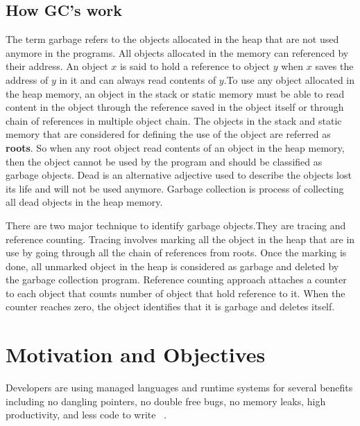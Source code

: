 \subsection{How GC's work}
The term garbage refers to the objects allocated in the heap that are not used anymore in the programs. All objects allocated in the memory can referenced by their address. An object $x$ is said to hold a reference to object $y$ when $x$ saves the address of $y$ in it and can always read contents of $y$.To use any object allocated in the heap memory, an object in the stack or static memory must be able to read content in the object through the reference saved in the object itself or through chain of references in multiple object chain.
The objects in the stack and static memory that are considered for defining the use of the object are referred as \textbf{roots}.
So when any root object read contents of an object in the heap memory, then the object cannot be used by the program and should be classified as garbage objects. Dead is an alternative adjective used to describe the objects lost its life and will not be used anymore. Garbage collection is process of collecting all dead objects in the heap memory. 

There are two major technique to identify garbage objects.They are tracing and reference counting. Tracing involves marking all the object in the heap that are in use by going through all the chain of references from roots. Once the marking is done, all unmarked object in the heap is considered as garbage and deleted by the garbage collection program. Reference counting approach attaches a counter to each object that counts number of object that hold reference to it. When the counter reaches zero, the object identifies that it is garbage and deletes itself.

\section{Motivation and Objectives}
\label{intro:motv}
Developers are using managed languages and runtime systems for several benefits including no dangling pointers, no double free bugs, no memory leaks, high productivity, and less code to write ~\cite{Butters}.  
\begin{comment}
The main advantage of the garbage collections are 
\begin{enumerate}
	\item Dangling Pointers
	\item Double free bugs
	\item Memory Leaks
\end{enumerate}
\end{comment}
